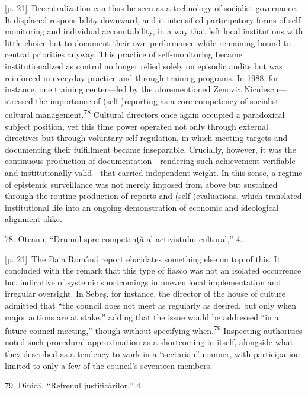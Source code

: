 \documentclass[10pt,a4paper]{article}
\begin{document}
{\scriptsize\color{gray} [p. 21]}\ Decentralization can thus be seen as a technology of socialist governance. It displaced responsibility downward, and it intensified participatory forms of self-monitoring and individual accountability, in a way that left local institutions with little choice but to document their own performance while remaining bound to central priorities anyway. This practice of self-monitoring became institutionalized as control no longer relied solely on episodic audits but was reinforced in everyday practice and through training programs. In 1988, for instance, one training center—led by the aforementioned Zenovia Niculescu—stressed the importance of (self-)reporting as a core competency of socialist cultural management.\nobreak\textsuperscript{78} Cultural directors once again occupied a paradoxical subject position, yet this time power operated not only through external directives but through voluntary self-regulation, in which meeting targets and documenting their fulfillment became inseparable. Crucially, however, it was the continuous production of documentation—rendering such achievement verifiable and institutionally valid—that carried independent weight. In this sense, a regime of epistemic surveillance was not merely imposed from above but sustained through the routine production of reports and (self-)evaluations, which translated institutional life into an ongoing demonstration of economic and ideological alignment alike.\par{\small 78. Oteanu, “Drumul spre competenţă al activistului cultural,” 4.\par}
{\scriptsize\color{gray} [p. 21]}\ The Daia Română report elucidates something else on top of this. It concluded with the remark that this type of fiasco was not an isolated occurrence but indicative of systemic shortcomings in uneven local implementation and irregular oversight. In Sebeș, for instance, the director of the house of culture admitted that “the council does not meet as regularly as desired, but only when major actions are at stake,” adding that the issue would be addressed “in a future council meeting,” though without specifying when.\nobreak\textsuperscript{79} Inspecting authorities noted such procedural approximation as a shortcoming in itself, alongside what they described as a tendency to work in a “sectarian” manner, with participation limited to only a few of the council’s seventeen members.\par{\small 79. Dinică, “Refrenul justificărilor,” 4.\par}
\end{document}
